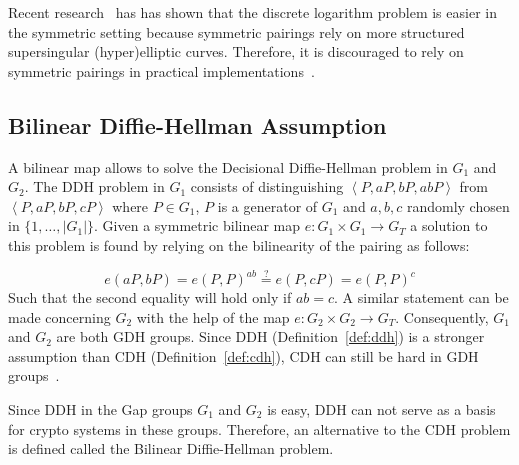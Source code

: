 Recent research~\cite{art:AdjMOR13,art:BarbulescuGJT14,art:Joux13} has has shown that the discrete logarithm problem is easier in the symmetric setting because symmetric pairings rely on more structured supersingular (hyper)elliptic curves. Therefore, it is discouraged to rely on symmetric pairings in practical implementations~\cite{art:ZhangW13}.

\subsection{Bilinear Diffie-Hellman Assumption}
A bilinear map allows to solve the Decisional Diffie-Hellman problem in $G_1$ and $G_2$. The DDH problem in $G_1$ consists of distinguishing $\left< P, aP, bP, abP \right>$ from $\left< P, aP, bP, cP \right>$ where $P \in G_1$, $P$ is a generator of $G_1$ and $a, b, c$ randomly chosen in $\{1, \ldots, \vert G_1 \vert \}$. Given a symmetric bilinear map $e: G_1 \times G_1 \rightarrow G_T$ a solution to this problem is found by relying on the bilinearity of the pairing as follows:

\begin{equation*}
 e \left( aP, bP \right) = e \left( P, P \right)^{ab} \stackrel{?}{=} e \left( P, cP \right) = e \left( P, P\right)^c
\end{equation*}
Such that the second equality will hold only if $ab = c$. A similar statement can be made concerning $G_2$ with the help of the map $e: G_2 \times G_2 \rightarrow G_T$. Consequently, $G_1$ and $G_2$ are both GDH groups. Since DDH (Definition~\ref{def:ddh}) is a stronger assumption than CDH (Definition~\ref{def:cdh}), CDH can still be hard in GDH groups~\cite{art:BonehF01}.

Since DDH in the Gap groups $G_1$ and $G_2$ is easy, DDH can not serve as a basis for crypto systems in these groups. Therefore, an alternative to the CDH problem is defined called the Bilinear Diffie-Hellman problem.

